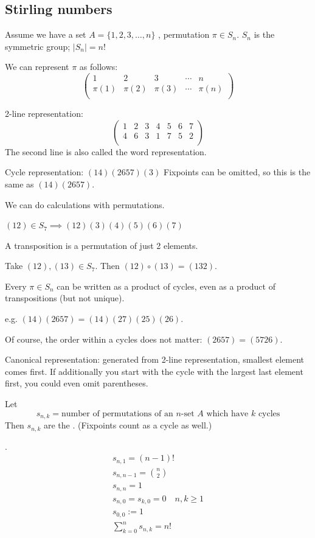\subsection{Stirling numbers}
Assume we have a set $A = \{1,2,3, \ldots ,n\}$
, permutation $\pi\in S_n$.
$S_n$ is the symmetric group; $|S_n| = n!$

We can represent $\pi$ as follows:
\[
  \begin{pmatrix}
    1&2&3&\cdots&n \\
    \pi(1)&\pi(2)&\pi(3)&\cdots&\pi(n) \\
  \end{pmatrix}
\]

2-line representation:
\[
  \begin{pmatrix}
    1&2&3&4&5&6&7 \\
    4&6&3&1&7&5&2 \\
  \end{pmatrix}
\]
The second line is also called the word representation.

Cycle representation:
$(1 4) (2 6 5 7) (3)$
Fixpoints can be omitted, so this is the same as $(14)(2657)$.

We can do calculations with permutations.

$(12)\in S_7 \implies (12)(3)(4)(5)(6)(7)$

A transposition is a permutation of just 2 elements.

Take $(12),(13)\in S_7$. Then $(12)\circ (13) = (132)$.

Every $\pi\in S_n$ can be written as a product of cycles, even as a product of transpositions (but not unique).

e.g. $(14)(2657) = (14)(27)(25)(26)$.

Of course, the order within a cycles does not matter:
$(2657)=(5726)$.

Canonical representation: generated from 2-line representation, smallest element comes first.
If additionally you start with the cycle with the largest last element first, you could even omit parentheses.

\begin{definition}
Let
\[
  s_{n,k} = \text{number of permutations of an $n$-set $A$ which have $k$ cycles}
\]
Then $s_{n,k}$ are the .
(Fixpoints count as a cycle as well.)
\end{definition}

\Remark.
\begin{gather*}
  s_{n,1} = (n-1)! \\
  s_{n,n-1} = {n\choose 2} \\
  s_{n,n} = 1 \\
  s_{n,0} = s_{k,0} = 0 \quad n,k ≥ 1 \\
  s_{0,0} := 1 \\
  \sum_{k=0}^{n} s_{n,k} = n!
\end{gather*}


